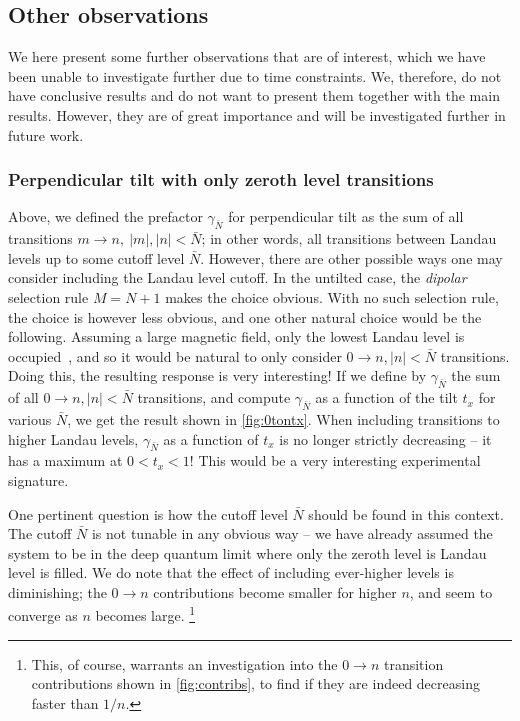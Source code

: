 \FloatBarrier
\subsection{Other observations}\label{sec:other-observe}
We here present some further observations that are of interest, which we have been unable to investigate further due to time constraints.
We, therefore, do not have conclusive results and do not want to present them together with the main results.
However, they are of great importance and will be investigated further in future work.

\subsubsection{Perpendicular tilt with only zeroth level transitions}\label{sec:other-observe:zeroton}
Above, we defined the prefactor \( \gamma_{\bar{N}} \) for perpendicular tilt as the sum of all transitions \( m\to n, \: |m|,|n| < \bar{N} \);
in other words, all transitions between Landau levels up to some cutoff level \( \bar{N} \).
However, there are other possible ways one may consider including the Landau level cutoff.
In the untilted case, the \emph{dipolar} selection rule \( M = N + 1 \) makes the choice obvious.
With no such selection rule, the choice is however less obvious, and one other natural choice would be the following.
Assuming a large magnetic field, only the lowest Landau level is occupied~\cite{chernodubThermalTransportGeometry2021}, and so it would be natural to only consider \( 0 \to n, |n| < \bar{N} \) transitions.
Doing this, the resulting response is very interesting!
If we define by \( \gamma_{\bar{N}} \) the sum of all \( 0\to n, |n| < \bar{N} \) transitions, and compute \( \gamma_{\bar{N}} \) as a function of the tilt \( t_x \) for various \( \bar{N} \), we get the result shown in \cref{fig:0tontx}.
When including transitions to higher Landau levels, \( \gamma_{\bar{N}} \) as a function of \( t_x \) is no longer strictly decreasing -- it has a maximum at \( 0 < t_x < 1 \)!
This would be a very interesting experimental signature.

One pertinent question is how the cutoff level \( \bar{N} \) should be found in this context.
The cutoff \( \bar{N} \) is not tunable in any obvious way -- we have already assumed the system to be in the deep quantum limit where only the zeroth level is Landau level is filled.
We do note that the effect of including ever-higher levels is diminishing;
the \( 0 \to n \) contributions become smaller for higher \( n \), and seem to converge as \( n \) becomes large.%
\footnote{This, of course, warrants an investigation into the \( 0\to n \) transition contributions shown in \cref{fig:contribs}, to find if they are indeed decreasing faster than \( 1 / n \).}


